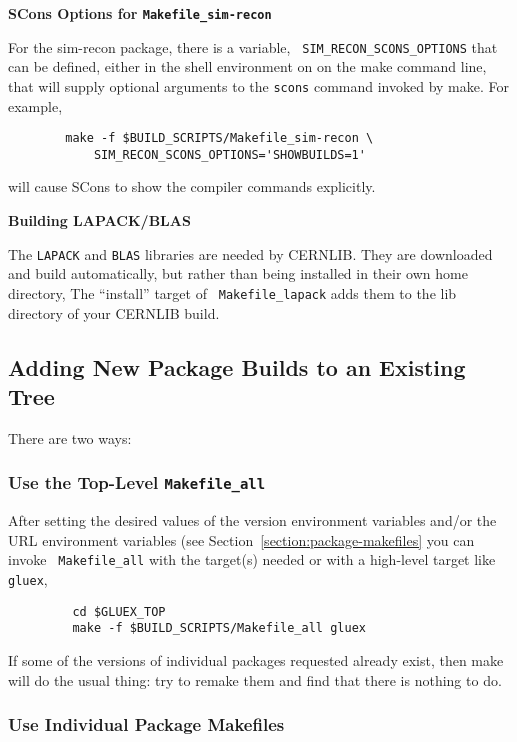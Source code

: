 \documentclass[12pt]{article}
\begin{document}
\begin{description}

\item{\bf SCons Options for {\tt Makefile\_sim-recon}}

For the sim-recon package, there is a variable, {\tt
  SIM\_RECON\_SCONS\_OPTIONS} that can be defined, either in the shell
environment on on the make command line, that will supply optional
arguments to the {\tt scons} command invoked by make. For example,
\begin{verbatim}
        make -f $BUILD_SCRIPTS/Makefile_sim-recon \
            SIM_RECON_SCONS_OPTIONS='SHOWBUILDS=1'
\end{verbatim}
will cause SCons to show the compiler commands explicitly.

\item{\bf Building LAPACK/BLAS}

The {\tt LAPACK} and {\tt BLAS} libraries are needed by CERNLIB. They
are downloaded and build automatically, but rather than being
installed in their own home directory, The ``install'' target of {\tt
  Makefile\_lapack} adds them to the lib directory of your CERNLIB
build.

\end{description}

\subsection{Adding New Package Builds to an Existing Tree}\label{section:adding-packages}

There are two ways:

\subsubsection{Use the Top-Level {\tt Makefile\_all}}

After setting the desired values of the version environment variables
and/or the URL environment variables (see
Section~\ref{section:package-makefiles} you can invoke {\tt
  Makefile\_all} with the target(s) needed or with a high-level target
like {\tt gluex},
\begin{verbatim}
         cd $GLUEX_TOP
         make -f $BUILD_SCRIPTS/Makefile_all gluex
\end{verbatim}
If some of the versions of individual packages requested already
exist, then make will do the usual thing: try to remake them and find
that there is nothing to do.

\subsubsection{Use Individual Package Makefiles}
\end{document}
